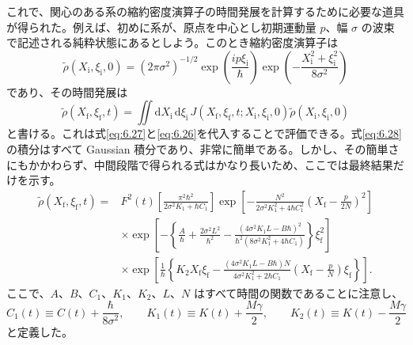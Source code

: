 これで、関心のある系の縮約密度演算子の時間発展を計算するために必要な道具が得られた。例えば、初めに系が、原点を中心とし初期運動量 $p$、幅 $\sigma$ の波束で記述される純粋状態にあるとしよう。このとき縮約密度演算子は
\begin{equation}
\tilde\rho(X_{\mathrm i},\xi_{\mathrm i},0)
=(2\pi\sigma^2)^{-1/2}
\exp\!\left(\frac{ip\xi_{\mathrm i}}{\hbar}\right)
\exp\!\left(-\frac{X_{\mathrm i}^2+\xi_{\mathrm i}^2}{8\sigma^2}\right)
\tag{6.27}\label{eq:6.27}
\end{equation}
であり、その時間発展は
\begin{equation}
\tilde\rho(X_{\mathrm f},\xi_{\mathrm f},t)
=\iint\mathrm dX_{\mathrm i}\,\mathrm d\xi_{\mathrm i}\,
J(X_{\mathrm f},\xi_{\mathrm f},t;X_{\mathrm i},\xi_{\mathrm i},0)
\tilde\rho(X_{\mathrm i},\xi_{\mathrm i},0)
\tag{6.28}\label{eq:6.28}
\end{equation}
と書ける。これは式\eqref{eq:6.27}と\eqref{eq:6.26}を代入することで評価できる。式\eqref{eq:6.28}の積分はすべて Gaussian 積分であり、非常に簡単である。しかし、その簡単さにもかかわらず、中間段階で得られる式はかなり長いため、ここでは最終結果だけを示す。
\begin{equation}
\begin{aligned}
\tilde\rho(X_{\mathrm f},\xi_{\mathrm f},t)
={}&F^2(t)\left[\frac{\pi^2\hbar^2}{2\sigma^2K_1+\hbar C_1}\right]
\exp\!\left[-\frac{N^2}{2\sigma^2K_1^2+4\hbar C_1^2}
\left(X_{\mathrm f}-\frac p{2N}\right)^2\right]\\
&\times\exp\!\left[-\left\{\frac A\hbar+\frac{2\sigma^2L^2}{\hbar^2}
-\frac{(4\sigma^2K_1L-B\hbar)^2}{\hbar^2(8\sigma^2K_1^2+4\hbar C_1)}\right\}\xi_{\mathrm f}^2\right]\\
&\times\exp\!\left[\frac1\hbar\left\{K_2X_{\mathrm f}\xi_{\mathrm f}
-\frac{(4\sigma^2K_1L-B\hbar)N}{4\sigma^2K_1^2+2\hbar C_1}
\left(X_{\mathrm f}-\frac pN\right)\xi_{\mathrm f}\right\}\right].
\end{aligned}
\tag{6.29}\label{eq:6.29}
\end{equation}
ここで、$A$、$B$、$C_1$、$K_1$、$K_2$、$L$、$N$ はすべて時間の関数であることに注意し、
\begin{equation}
C_1(t)\equiv C(t)+\frac{\hbar}{8\sigma^2},\qquad
K_1(t)\equiv K(t)+\frac{M\gamma}{2},\qquad
K_2(t)\equiv K(t)-\frac{M\gamma}{2}
\tag{6.30}\label{eq:6.30}
\end{equation}
と定義した。

